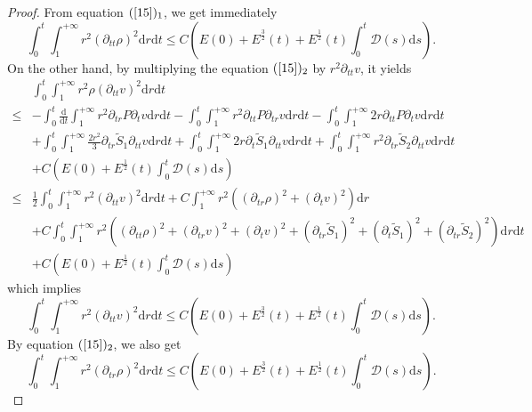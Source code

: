 \documentclass[10pt,reqno]{amsart}
\numberwithin{equation}{section}
\begin{document}
\begin{proof}
		From equation $(\ref{15})_{1}$, we get immediately
		\begin{equation}\label{2dis2}
			\int_0^t\int_{1}^{+\infty}r^2(\partial_{tt}\rho)^2
			\mathrm{d}r\mathrm{d}t
			\leq C(E(0)+E^{\frac{3}{2}}(t)+E^{\frac{1}{2}}(t)\int_{0}^{t} \mathcal{D}(s)\mathrm{d}s).
		\end{equation}
		On the other hand, by multiplying the equation
		$(\ref{15})_{2}$ by $r^2\partial_{tt}v$, it yields
		\begin{equation}\nonumber
			\begin{aligned}
				&\int_0^t\int_{1}^{+\infty}r^2\rho(\partial_{tt}v)^2\mathrm{d}r\mathrm{d}t\\
				\leq&-\int_0^t\frac{\mathrm{d}}{\mathrm{d}t}\int_{1}^{+\infty}r^2\partial_{tr}P\partial_{t}v\mathrm{d}r\mathrm{d}t
				-\int_0^t\int_{1}^{+\infty}r^2\partial_{tt}P\partial_{tr}v\mathrm{d}r\mathrm{d}t
				-\int_0^t\int_{1}^{+\infty}2r\partial_{tt}P\partial_{t}v\mathrm{d}r\mathrm{d}t\\
				&+\int_0^t\int_{1}^{+\infty}\frac{2r^2}{3}\partial_{tr}\tilde{S}_1\partial_{tt}v\mathrm{d}r\mathrm{d}t
				+\int_0^t\int_{1}^{+\infty}2r\partial_{t}\tilde{S}_1\partial_{tt}v\mathrm{d}r\mathrm{d}t
				+\int_0^t\int_{1}^{+\infty}r^2\partial_{tr}\tilde{S}_2\partial_{tt}v\mathrm{d}r\mathrm{d}t\\
				&+C(E(0)+E^{\frac{1}{2}}(t)\int_{0}^{t} \mathcal{D}(s)\mathrm{d}s)\\
				\leq&\frac{1}{2}\int_0^t\int_{1}^{+\infty}r^2(\partial_{tt}v)^2\mathrm{d}r\mathrm{d}t
				+C\int_{1}^{+\infty}r^2((\partial_{tr}\rho)^2+(\partial_{t}v)^2)\mathrm{d}r\\
				&+C\int_0^t\int_{1}^{+\infty}r^2((\partial_{tt}\rho)^2
				+(\partial_{tr}v)^2+(\partial_{t}v)^2
				+(\partial_{tr}\tilde{S}_1)^2+(\partial_{t}\tilde{S}_1)^2+(\partial_{tr}\tilde{S}_2)^2)
				\mathrm{d}r\mathrm{d}t\\
				&+C(E(0)+E^{\frac{1}{2}}(t)\int_{0}^{t} \mathcal{D}(s)\mathrm{d}s)
			\end{aligned}
		\end{equation}
		which implies
		\begin{equation}\label{2dis3}
			\int_0^t\int_{1}^{+\infty}r^2(\partial_{tt}v)^2
			\mathrm{d}r\mathrm{d}t
			\leq C(E(0)+E^{\frac{3}{2}}(t)+E^{\frac{1}{2}}(t)\int_{0}^{t} \mathcal{D}(s)\mathrm{d}s).
		\end{equation}
		By equation $(\ref{15})_2$, we also get
		\begin{equation}\label{2dis4}
			\int_0^t\int_{1}^{+\infty}r^2(\partial_{tr}\rho)^2
			\mathrm{d}r\mathrm{d}t
			\leq C(E(0)+E^{\frac{3}{2}}(t)+E^{\frac{1}{2}}(t)\int_{0}^{t} \mathcal{D}(s)\mathrm{d}s).
		\end{equation}
		

\end{proof}
\end{document}
